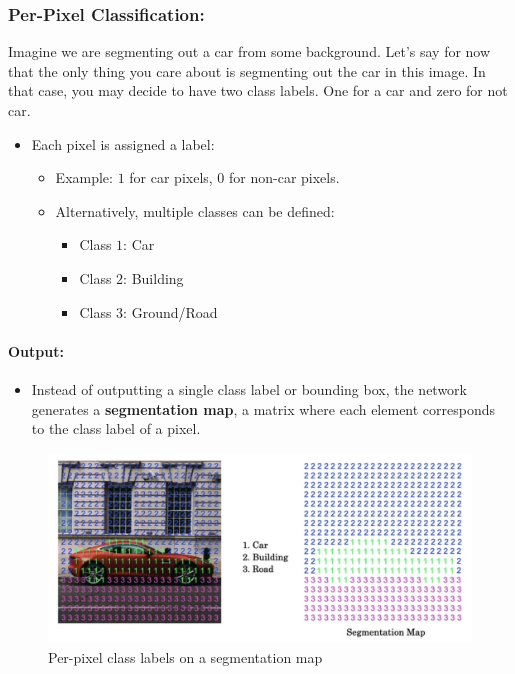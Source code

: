 \documentclass[letterpaper,12pt,notitlepage,twoside]{report}
\begin{document}
\subsubsection*{Per-Pixel Classification:}
Imagine we are segmenting out a car from some background. Let's say for now that the only thing you care about is segmenting out the car in this image. In that case, you may decide to have two class labels. One for a car and zero for not car. 

\begin{itemize}
    \item Each pixel is assigned a label:
    \begin{itemize}
        \item Example: $1$ for car pixels, $0$ for non-car pixels.
        \item Alternatively, multiple classes can be defined:
        \begin{itemize}
            \item Class $1$: Car
            \item Class $2$: Building
            \item Class $3$: Ground/Road
        \end{itemize}
    \end{itemize}
\end{itemize}

\paragraph{Output:}
\begin{itemize}
    \item Instead of outputting a single class label or bounding box, the network generates a \textbf{segmentation map}, a matrix where each element corresponds to the class label of a pixel.
\end{itemize}

\begin{figure}[h]
	\centering
	\includegraphics[width=\textwidth]{Images/Segmentation Map.png}
	\caption{Per-pixel class labels on a segmentation map}
	\label{fig:46}
\end{figure}
\FloatBarrier
\end{document}
